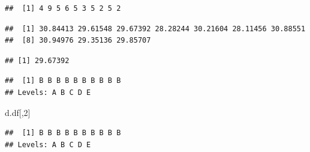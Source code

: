 \documentclass[]{article}
\newenvironment{Shaded}{\begin{snugshade}}{\end{snugshade}}
\newcommand{\KeywordTok}[1]{\textcolor[rgb]{0.13,0.29,0.53}{\textbf{#1}}}
\newcommand{\DataTypeTok}[1]{\textcolor[rgb]{0.13,0.29,0.53}{#1}}
\newcommand{\DecValTok}[1]{\textcolor[rgb]{0.00,0.00,0.81}{#1}}
\newcommand{\CommentTok}[1]{\textcolor[rgb]{0.56,0.35,0.01}{\textit{#1}}}
\newcommand{\OperatorTok}[1]{\textcolor[rgb]{0.81,0.36,0.00}{\textbf{#1}}}
\newcommand{\NormalTok}[1]{#1}
\begin{document}
\begin{verbatim}
##  [1] 4 9 5 6 5 3 5 2 5 2
\end{verbatim}

\begin{Shaded}
\end{Shaded}

\begin{verbatim}
##  [1] 30.84413 29.61548 29.67392 28.28244 30.21604 28.11456 30.88551
##  [8] 30.94976 29.35136 29.85707
\end{verbatim}

\begin{Shaded}
\end{Shaded}

\begin{verbatim}
## [1] 29.67392
\end{verbatim}

\begin{Shaded}
\end{Shaded}

\begin{verbatim}
##  [1] B B B B B B B B B B
## Levels: A B C D E
\end{verbatim}

\begin{Shaded}
\begin{Highlighting}[]
\NormalTok{d.df[,}\DecValTok{2}\NormalTok{]}
\end{Highlighting}
\end{Shaded}

\begin{verbatim}
##  [1] B B B B B B B B B B
## Levels: A B C D E
\end{verbatim}

\begin{Shaded}
\end{Shaded}
\end{document}
